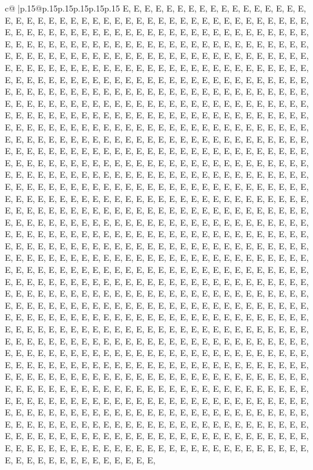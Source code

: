 \documentclass{article}
\begin{document}
{\begin{supertabular}{c@{$\;$}|p{.15\linewidth}@{}p{.15\linewidth}p{.15\linewidth}p{.15\linewidth}p{.15\linewidth}p{.15\linewidth}}
{{{E, E, E, E, E, E, E, E, E, E, E, E, E, E, E, E, E, E, E, E, E, E, E, E, E, E, E, E, E, E, E, E, E, E, E, E, E, E, E, E, E, E, E, E, E, E, E, E, E, E, E, E, E, E, E, E, E, E, E, E, E, E, E, E, E, E, E, E, E, E, E, E, E, E, E, E, E, E, E, E, E, E, E, E, E, E, E, E, E, E, E, E, E, E, E, E, E, E, E, E, E, E, E, E, E, E, E, E, E, E, E, E, E, E, E, E, E, E, E, E, E, E, E, E, E, E, E, E, E, E, E, E, E, E, E, E, E, E, E, E, E, E, E, E, E, E, E, E, E, E, E, E, E, E, E, E, E, E, E, E, E, E, E, E, E, E, E, E, E, E, E, E, E, E, E, E, E, E, E, E, E, E, E, E, E, E, E, E, E, E, E, E, E, E, E, E, E, E, E, E, E, E, E, E, E, E, E, E, E, E, E, E, E, E, E, E, E, E, E, E, E, E, E, E, E, E, E, E, E, E, E, E, E, E, E, E, E, E, E, E, E, E, E, E, E, E, E, E, E, E, E, E, E, E, E, E, E, E, E, E, E, E, E, E, E, E, E, E, E, E, E, E, E, E, E, E, E, E, E, E, E, E, E, E, E, E, E, E, E, E, E, E, E, E, E, E, E, E, E, E, E, E, E, E, E, E, E, E, E, E, E, E, E, E, E, E, E, E, E, E, E, E, E, E, E, E, E, E, E, E, E, E, E, E, E, E, E, E, E, E, E, E, E, E, E, E, E, E, E, E, E, E, E, E, E, E, E, E, E, E, E, E, E, E, E, E, E, E, E, E, E, E, E, E, E, E, E, E, E, E, E, E, E, E, E, E, E, E, E, E, E, E, E, E, E, E, E, E, E, E, E, E, E, E, E, E, E, E, E, E, E, E, E, E, E, E, E, E, E, E, E, E, E, E, E, E, E, E, E, E, E, E, E, E, E, E, E, E, E, E, E, E, E, E, E, E, E, E, E, E, E, E, E, E, E, E, E, E, E, E, E, E, E, E, E, E, E, E, E, E, E, E, E, E, E, E, E, E, E, E, E, E, E, E, E, E, E, E, E, E, E, E, E, E, E, E, E, E, E, E, E, E, E, E, E, E, E, E, E, E, E, E, E, E, E, E, E, E, E, E, E, E, E, E, E, E, E, E, E, E, E, E, E, E, E, E, E, E, E, E, E, E, E, E, E, E, E, E, E, E, E, E, E, E, E, E, E, E, E, E, E, E, E, E, E, E, E, E, E, E, E, E, E, E, E, E, E, E, E, E, E, E, E, E, E, E, E, E, E, E, E, E, E, E, E, E, E, E, E, E, E, E, E, E, E, E, E, E, E, E, E, E, E, E, E, E, E, E, E, E, E, E, E, E, E, E, E, E, E, E, E, E, E, E, E, E, E, E, E, E, E, E, E, E, E, E, E, E, E, E, E, E, E, E, E, E, E, E, E, E, E, E, E, E, E, E, E, E, E, E, E, E, E, E, E, E, E, E, E, E, E, E, E, E, E, E, E, E, E, E, E, E, E, E, E, E, E, E, E, E, E, E, E, E, E, E, E, E, E, E, E, E, E, E, E, E, E, E, E, E, E, E, E, E, E, E, E, E, E, E, E, E, E, E, E, E, E, E, E, E, E, E, E, E, E, E, E, E, E, E, E, E, E, E, E, E, E, E, E, E, E, E, E, E, E, E, E, E, E, E, E, E, E, E, E, E, E, E, E, E, E, E, E, E, E, E, E, E, E, E, E, E, E, E, E, E, E, E, E, E, E, E, E, E, E, E, E, E, E, E, E, E, E, E, E, E, E, E, E, E, E, E, E, E, E, E, E, E, E, E, E, E, E, E, E, E, E, E, E, E, E, E, E, E, E, E, E, E, E, E, E, E, E, E, E, E, E, E, E, E, E, E, E, E, E, E, E, E, E, E, E, E, E, E, E, E, E, E, E, E, E, E, E, E, E, E, E, E, E, E, E, E, E, E, E, E, E, E, E, E, E, E, E, E, E, E, E, E, E, E, E, E, E, E, E, E, E, E, E, E, E, E, E, E, E, E, E, E, E, E, E, E, E, E, E, E, E, E, E, E, E, E, E, E, E, E, E, E, E, E, E, E, E, E, E, E, E, E, E, E, E, E, E, E, E, E, E, E, E, E, E, E, E, E, E, E, E, E, E, E, E, E, E, E, E, E, E, E, E, E, E, E, E, E, E, E, E, E, E, E, E, E, E, E, E, E, E, E, E, E, E, E, E, E, E, E, E, E, E, E, E, E, E, E, E, E, E, E, E, E, E, E, E, E, E, E, E, E, E, E, E, E, E, E, E, E, E, E, E, E, E, E, E, E, E, E, E, E, E, E, E, E, E, E, E, E, E, }}}
\end{supertabular}}
\end{document}
